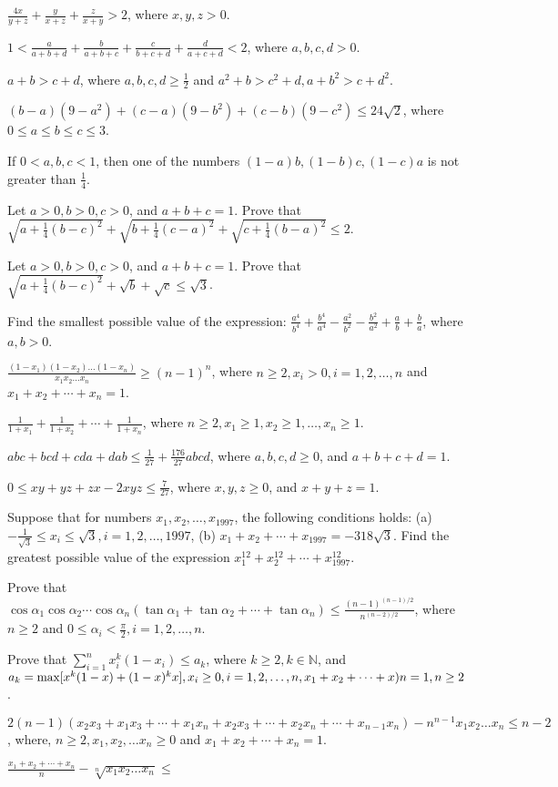 \item $\frac{4x}{y + z} + \frac{y}{x + z} + \frac{z}{x + y} > 2$, where $x,y,z > 0$.
\item $1 < \frac{a}{a + b + d} + \frac{b}{a + b + c} + \frac{c}{b + c + d} + \frac{d}{a + c + d}< 2$, where $a,b,c,d > 0$.
\item $a + b > c + d$, where $a, b, c, d\geq \frac{1}{2}$ and $a^2 + b > c^2 + d, a + b^2 > c + d^2$.
\item $(b - a)(9 - a^2) + (c - a)(9 - b^2) + (c - b)(9 - c^2)\leq 24\sqrt{2}$, where $0\leq a\leq b\leq c\leq 3$.
\item If $0<a, b, c < 1$, then one of the numbers $(1 - a)b, (1 - b)c, (1 - c)a$ is not greater than $\frac{1}{4}$.
\item Let $a > 0, b > 0, c > 0$, and $a + b + c = 1$. Prove that $\sqrt{a + \frac{1}{4}(b - c)^2} + \sqrt{b + \frac{1}{4}(c - a)^2}
  + \sqrt{c + \frac{1}{4}(b - a)^2}\leq 2$.
\item Let $a > 0, b > 0, c > 0$, and $a + b + c = 1$. Prove that $\sqrt{a + \frac{1}{4}(b - c)^2} + \sqrt{b} + \sqrt{c}\leq
  \sqrt{3}$.
\item Find the smallest possible value of the expression: $\frac{a^4}{b^4} + \frac{b^4}{a^4} - \frac{a^2}{b^2} - \frac{b^2}{a^2} +
  \frac{a}{b} + \frac{b}{a}$, where $a, b > 0$.
\item $\frac{(1 - x_1)(1 - x_2)\ldots(1 - x_n)}{x_1x_2\ldots x_n}\geq (n - 1)^n$, where $n\geq 2, x_i>0,  i = 1, 2, \ldots, n$ and
  $x_1 + x_2 + \cdots + x_n = 1$.
\item $\frac{1}{1 + x_1} + \frac{1}{1 + x_2} + \cdots + \frac{1}{1 + x_n}$, where $n\geq 2, x_1\geq 1, x_2\geq 1, \ldots, x_n\geq
  1$.
\item $abc + bcd + cda + dab\leq \frac{1}{27} + \frac{176}{27}abcd$, where $a, b, c, d\geq 0$, and $a + b + c + d = 1$.
\item $0\leq xy + yz + zx - 2xyz\leq \frac{7}{27}$, where $x, y, z\geq 0$, and $x + y + z = 1$.
\item Suppose that for numbers $x_1, x_2, \ldots, x_{1997}$, the following conditions holds: (a) $-\frac{1}{\sqrt{3}}\leq x_i \leq
  \sqrt{3}, i = 1, 2, \ldots, 1997$, (b) $x_1 + x_2 + \cdots + x_{1997} = -318\sqrt{3}$. Find the greatest possible value of the
  expression $x_1^{12} + x_2^{12} + \cdots + x_{1997}^{12}$.
\item Prove that $\cos\alpha_1\cos\alpha_2\cdots\cos\alpha_n(\tan\alpha_1 + \tan\alpha_2 + \cdots + \tan\alpha_n)\leq \frac{(n-
  1)^{(n - 1)/2}}{n^{(n - 2)/2}}$, where $n\geq 2$ and $0\leq \alpha_i<\frac{\pi}{2}, i = 1, 2, \ldots, n$.
\item Prove that $\displaystyle\sum_{i=1}^nx_i^k(1 - x_i)\leq a_k$, where $k\geq 2, k\in\mathbb{N}$, and $a_k = {\rm \max}[x^k(1 -
  x) + (1 - x)^kx], x_i\geq 0, i=1, 2, \ldots, n, x_1 + x_2 + \cdots + x)n = 1, n\geq 2$.
\item $2(n - 1)(x_2x_3 + x_1x_3 + \cdots + x_1x_n + x_2x_3 + \cdots + x_2x_n + \cdots + x_{n - 1}x_n) - n^{n - 1}x_1x_2\ldots
  x_n\leq n - 2$, where, $n\geq 2, x_1, x_2, \ldots x_n\geq 0$ and $x_1 + x_2 + \cdots + x_n = 1$.
\item $\frac{x_1 + x_2 + \cdots + x_n}{n} - \sqrt[n]{x_1x_2\ldots x_n}\leq$

